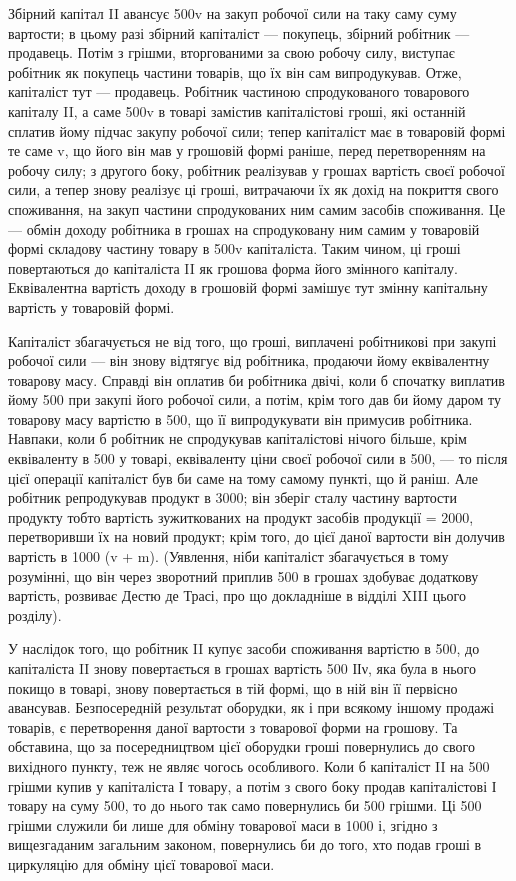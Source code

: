 Збірний капітал II авансує 500v на закуп робочої сили на таку саму
суму вартости; в цьому разі збірний капіталіст — покупець, збірний
робітник — продавець. Потім з грішми, вторгованими за свою робочу силу,
виступає робітник як покупець частини товарів, що їх він сам випродукував.
Отже, капіталіст тут — продавець. Робітник частиною спродукованого
товарового капіталу II, а саме 500v в товарі замістив капіталістові
гроші, які останній сплатив йому підчас закупу робочої сили; тепер
капіталіст має в товаровій формі те саме v, що його він мав у грошовій
формі раніше, перед перетворенням на робочу силу; з другого боку,
робітник реалізував у грошах вартість своєї робочої сили, а тепер знову
реалізує ці гроші, витрачаючи їх як дохід на покриття свого споживання,
на закуп частини спродукованих ним самим засобів споживання. Це —
обмін доходу робітника в грошах на спродуковану ним самим у товаровій
формі складову частину товару в 500v капіталіста. Таким чином,
ці гроші повертаються до капіталіста II як грошова форма його змінного
капіталу. Еквівалентна вартість доходу в грошовій формі замішує тут
змінну капітальну вартість у товаровій формі.

Капіталіст збагачується не від того, що гроші, виплачені робітникові
при закупі робочої сили — він знову відтягує від робітника, продаючи йому
еквівалентну товарову масу. Справді він оплатив би робітника двічі, коли
б спочатку виплатив йому 500 при закупі його робочої сили, а потім,
крім того дав би йому даром ту товарову масу вартістю в 500, що її
випродукувати він примусив робітника. Навпаки, коли б робітник не
спродукував капіталістові нічого більше, крім еквіваленту в 500 у товарі,
еквіваленту ціни своєї робочої сили в 500, — то після цієї операції капіталіст
був би саме на тому самому пункті, що й раніш. Але робітник
репродукував продукт в 3000; він зберіг сталу частину вартости
продукту тобто вартість зужиткованих на продукт засобів продукції = 2000,
перетворивши їх на новий продукт; крім того, до цієї даної
вартости він долучив вартість в 1000 (v + m). (Уявлення, ніби капіталіст
збагачується в тому розумінні, що він через зворотний приплив
500 в грошах здобуває додаткову вартість, розвиває Дестю де Трасі, про
що докладніше в відділі XIII цього розділу).

У наслідок того, що робітник II купує засоби споживання вартістю
в 500, до капіталіста II знову повертається в грошах вартість 500 ІІν,
яка була в нього покищо в товарі, знову повертається в тій формі, що
в ній він її первісно авансував. Безпосередній результат оборудки, як і
при всякому іншому продажі товарів, є перетворення даної вартости з
товарової форми на грошову. Та обставина, що за посередництвом цієї
оборудки гроші повернулись до свого вихідного пункту, теж не являє
чогось особливого. Коли б капіталіст II на 500 грішми купив у капіталіста
І товару, а потім з свого боку продав капіталістові І товару на
суму 500, то до нього так само повернулись би 500 грішми. Ці 500 грішми
служили би лише для обміну товарової маси в 1000 і, згідно з вищезгаданим
загальним законом, повернулись би до того, хто подав гроші в
циркуляцію для обміну цієї товарової маси.
